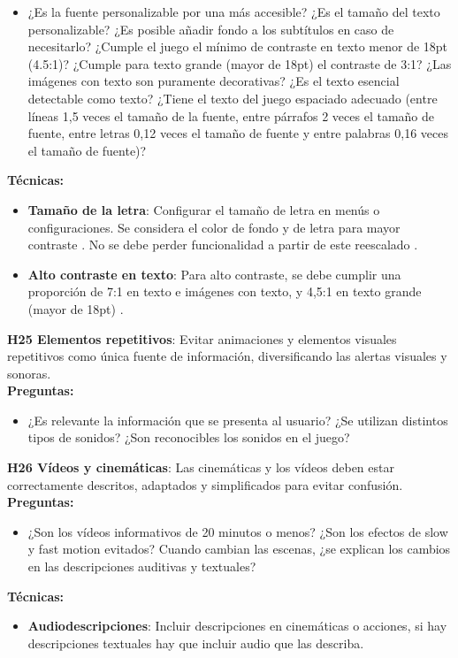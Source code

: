 \begin{itemize}
	\item ¿Es la fuente personalizable por una más accesible? ¿Es el tamaño del texto personalizable? ¿Es posible añadir fondo a los subtítulos en caso de necesitarlo? ¿Cumple el juego el mínimo de contraste en texto menor de 18pt (4.5:1)? ¿Cumple para texto grande (mayor de 18pt) el contraste de 3:1? ¿Las imágenes con texto son puramente decorativas? ¿Es el texto esencial detectable como texto? ¿Tiene el texto del juego espaciado adecuado (entre líneas 1,5 veces el tamaño de la fuente, entre párrafos 2 veces el tamaño de fuente, entre letras 0,12 veces el tamaño de fuente y entre palabras 0,16 veces el tamaño de fuente)?
\end{itemize}
\textbf{Técnicas:}
\begin{itemize}
	\item \textbf{Tamaño de la letra}: Configurar el tamaño de letra en menús o configuraciones. Se considera el color de fondo y de letra para mayor contraste \cite{LibroBlancoAccesibilidad}. No se debe perder funcionalidad a partir de este reescalado \cite{WebContentAccessibility}.
	\item \textbf{Alto contraste en texto}: Para alto contraste, se debe cumplir una proporción de 7:1 en texto e imágenes con texto, y 4,5:1 en texto grande (mayor de 18pt) \cite{WebContentAccessibility}.
\end{itemize}
\textbf{H25 Elementos repetitivos}:  Evitar animaciones y elementos visuales repetitivos como única fuente de información, diversificando las alertas visuales y sonoras. \cite{darinPrinciplesEvaluatingUsability2019} \cite{teixeiraborgesFairPlayGuidelines2018a}\\
\textbf{Preguntas:}
\begin{itemize}
	\item ¿Es relevante la información que se presenta al usuario? ¿Se utilizan distintos tipos de sonidos? ¿Son reconocibles los sonidos en el juego?
\end{itemize}
\textbf{H26 Vídeos y cinemáticas}: Las cinemáticas y los vídeos deben estar correctamente descritos, adaptados y simplificados para evitar confusión. \cite{jimenezhurtadoDimensionsSubdimensionsEQUIT2025}\\
\textbf{Preguntas:}
\begin{itemize}
	\item ¿Son los vídeos informativos de 20 minutos o menos? ¿Son los efectos de slow y fast motion evitados? Cuando cambian las escenas, ¿se explican los cambios en las descripciones auditivas y textuales?
\end{itemize}
\textbf{Técnicas:}
\begin{itemize}
	\item \textbf{Audiodescripciones}: Incluir descripciones en cinemáticas o acciones, si hay descripciones textuales hay que incluir audio que las describa. \cite{LibroBlancoAccesibilidad} 
\end{itemize}
 
